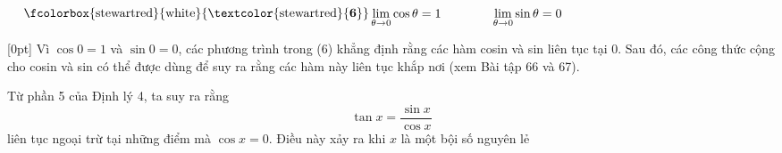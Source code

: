 \begin{equation*}
\raisebox{0.1ex}{\fboxrule=0.8pt\fboxsep=2.5pt\fcolorbox{stewartred}{white}{\textcolor{stewartred}{\textbf{6}}}}
\hfill
\lim_{\theta \to 0} \cos\theta = 1 \qquad\qquad \lim_{\theta \to 0} \sin\theta = 0
\hfill
\phantom{\raisebox{0.1ex}{\fboxrule=0.8pt\fboxsep=2.5pt\fcolorbox{stewartred}{white}{\textbf{6}}}}
\end{equation*}

\noindent
{}[0pt]%
Vì $\cos 0 = 1$ và $\sin 0 = 0$, các phương trình trong (6) khẳng định rằng các hàm cosin và sin liên tục tại 0. Sau đó, các công thức cộng cho cosin và sin có thể được dùng để suy ra rằng các hàm này liên tục khắp nơi (xem Bài tập 66 và 67).

Từ phần 5 của Định lý 4, ta suy ra rằng
\[
\tan x = \frac{\sin x}{\cos x}
\]
\noindent
liên tục ngoại trừ tại những điểm mà $\cos x = 0$. Điều này xảy ra khi $x$ là một bội số nguyên lẻ

